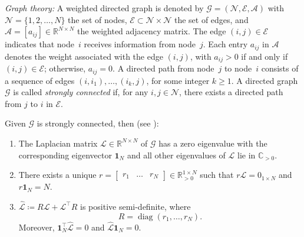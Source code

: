 \documentclass[journal]{IEEEtran}
\newcommand{\diag}{\operatorname{diag}}	%
\def\T{\top}
\def\bmat{\begin{bmatrix}}
\def\emat{\end{bmatrix}}
\begin{document}
\textit{Graph theory:}
A weighted directed graph is denoted by $\mathcal{G} = (\mathcal{N}, \mathcal{E}, \mathcal{A})$ with $\mathcal{N} = \{1, 2, \ldots, N\}$ the set of nodes, $\mathcal{E} \subset \mathcal{N} \times \mathcal{N}$ the set of edges, and $\mathcal{A} = [a_{ij}] \in \mathbb{R}^{N \times N}$ the weighted adjacency matrix. The edge $(i,j)\in\mathcal E$ indicates that node~$i$ receives information from node~$j$. Each entry $a_{ij}$ in $\mathcal{A}$ denotes the weight associated with the edge $(i,j)$, with $a_{ij}>0$ if and only if $(i,j) \in \mathcal{E}$; otherwise, $a_{ij} = 0$. 
A directed path from node~$j$ to node~$i$ consists of a sequence of edges $(i, i_{1}),\dots,(i_k,j)$, for some integer $k\geq 1$. 
A directed graph $\mathcal{G}$ is called \textit{strongly connected} if, for any $i,j\in\mathcal N$, there exists a directed path from $j$ to $i$ in $\mathcal E$. 

Given $\mathcal G$ is strongly connected, then (see \cite{Trentelman19, Wenwu2010, Olfati2004, Wei2005}):

\begin{enumerate}[{Fact} 1:]
    \item The Laplacian matrix $\mathcal{L}\in\mathbb R^{N\times N}$ of $\mathcal G$ has a zero eigenvalue with the corresponding eigenvector $\mathbf{1}_N$ and all other eigenvalues of $\mathcal{L}$ lie in $\mathbb C_{>0}$.
    \label{fact1}
    \item There exists a unique $r = \bmat r_1 & \ldots & r_N\emat\in\mathbb R_{>0}^{1\times N}$ such that $r \mathcal{L} = 0_{1\times N}$ and $r\textbf{1}_N = N$. \label{lem:stronggraphs}
    \item $\hat {\mathcal{L}}\coloneqq R\mathcal{L}+\mathcal{L}^\T R$ is positive semi-definite, where
    \begin{equation} \label{eq:R-matrix}
        R = \diag(r_1,\ldots,r_N).
    \end{equation}
    Moreover, $\textbf{1}^{\T}_N \hat {\mathcal{L}} = 0$ and $\hat {\mathcal{L}} \textbf{1}_N = 0.$
    \label{fact3}
\end{enumerate}
\end{document}
